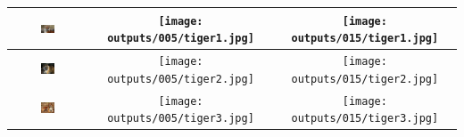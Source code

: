\documentclass{article}%
\begin{document}
\begin{table}[ht]
\begin{center}
\begin{tabular}{|c|c|c|}
\hline%
\includegraphics[width=0.2\textwidth]{images/tiger1.jpg}&\texttt{[image: outputs/005/tiger1.jpg]}&\texttt{[image: outputs/015/tiger1.jpg]}\\%
\hline%
\includegraphics[width=0.2\textwidth]{images/tiger2.jpg}&\texttt{[image: outputs/005/tiger2.jpg]}&\texttt{[image: outputs/015/tiger2.jpg]}\\%
\hline%
\includegraphics[width=0.2\textwidth]{images/tiger3.jpg}&\texttt{[image: outputs/005/tiger3.jpg]}&\texttt{[image: outputs/015/tiger3.jpg]}\\%
\hline%
\end{tabular}%
\end{center}%
\end{table}

%
\end{document}
